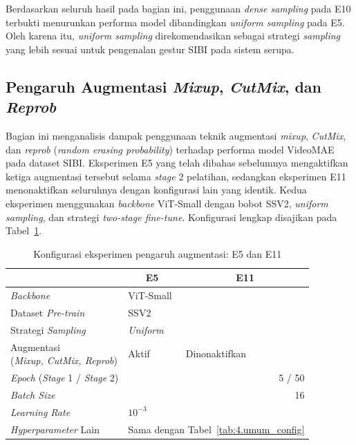 Berdasarkan seluruh hasil pada bagian ini, penggunaan \textit{dense sampling} pada E10 terbukti menurunkan performa model dibandingkan \textit{uniform sampling} pada E5. Oleh karena itu, \textit{uniform sampling} direkomendasikan sebagai strategi \textit{sampling} yang lebih sesuai untuk pengenalan gestur SIBI pada sistem serupa.\par

\subsection{Pengaruh Augmentasi \textit{Mixup}, \textit{CutMix}, dan \textit{Reprob}} \label{IV.Sek5}

Bagian ini menganalisis dampak penggunaan teknik augmentasi \textit{mixup}, \textit{CutMix}, dan \textit{reprob} (\textit{random erasing probability}) terhadap performa model VideoMAE pada dataset SIBI. Eksperimen E5 yang telah dibahas sebelumnya mengaktifkan ketiga augmentasi tersebut selama \textit{stage} 2 pelatihan, sedangkan eksperimen E11 menonaktifkan seluruhnya dengan konfigurasi lain yang identik. Kedua eksperimen menggunakan \textit{backbone} ViT-Small dengan bobot SSV2, \textit{uniform sampling}, dan strategi \textit{two-stage fine-tune}. Konfigurasi lengkap disajikan pada Tabel~\ref{tab:4.s5aug_config}.\par

\begin{table}[H]
\centering
\caption{Konfigurasi eksperimen pengaruh augmentasi: E5 dan E11}
\label{tab:4.s5aug_config}
{\setlength{\tabcolsep}{3pt}
\footnotesize
\begin{tabular}{|l|r|r|}
\hline
\rowcolor{gray!15} \multicolumn{1}{|l|}{\textbf{Parameter}} & \multicolumn{1}{c|}{\cellcolor{gray!15}\textbf{E5}} & \multicolumn{1}{c|}{\cellcolor{gray!15}\textbf{E11}} \\
\hline
\textit{Backbone} & \multicolumn{2}{l|}{ViT-Small} \\
\hline
Dataset \textit{Pre-train} & \multicolumn{2}{l|}{SSV2} \\
\hline
Strategi \textit{Sampling} & \multicolumn{2}{l|}{\textit{Uniform}} \\
\hline
\makecell[l]{Augmentasi\\(\textit{Mixup, CutMix, Reprob})} & \multicolumn{1}{l|}{Aktif} & \multicolumn{1}{l|}{Dinonaktifkan} \\
\hline
\textit{Epoch} (\textit{Stage} 1 / \textit{Stage} 2) & \multicolumn{2}{r|}{5 / 50} \\
\hline
\textit{Batch Size} & \multicolumn{2}{r|}{16} \\
\hline
\textit{Learning Rate} & \multicolumn{2}{l|}{$10^{-3}$} \\
\hline
\textit{Hyperparameter} Lain & \multicolumn{2}{c|}{Sama dengan Tabel~\ref{tab:4.umum_config}} \\
\hline
\end{tabular}
}
\end{table}

